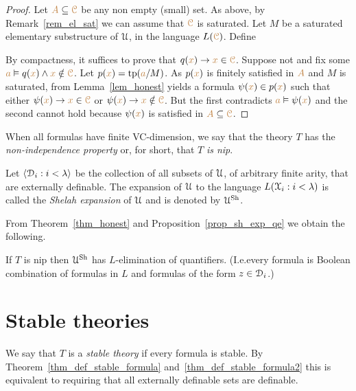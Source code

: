 \documentclass[creche.tex]{subfiles}
\begin{document}
\begin{proof}
Let ${\color{brown} A}\subseteq{\color{brown}\EuScript C}$ be any non empty (small) set. As above, by  Remark~\ref{rem_el_sat} we can assume that ${\color{brown}\EuScript C}$ is saturated. Let $M$ be a saturated elementary substructure of $\EuScript U$, in the language $L({\color{brown}\EuScript C})$. Define


By compactness, it suffices to prove that $q({\color{brown} x})\rightarrow {\color{brown}x}\in{\color{brown}\EuScript C}$. Suppose not and fix some ${\color{brown} a}\vDash q({\color{brown} x})\wedge {\color{brown}x}\notin{\color{brown}\EuScript C}$. Let $p({\color{brown} x})={\rm tp}({\color{brown} a}/M)$. As $p({\color{brown} x})$ is finitely satisfied in ${\color{brown} A}$ and $M$ is saturated, from Lemma~\ref{lem_honest} yields a formula $\psi({\color{brown} x})\in p({\color{brown} x})$ such that either $\psi({\color{brown} x})\rightarrow {\color{brown}x}\in{\color{brown}\EuScript C}$ or $\psi({\color{brown} x})\rightarrow {\color{brown}x}\notin{\color{brown}\EuScript C}$. But the first contradicts ${\color{brown} a}\vDash\psi({\color{brown} x})$ and the second cannot hold because $\psi({\color{brown} x})$ is satisfied in ${\color{brown} A}\subseteq{\color{brown}\EuScript C}$. 
\end{proof}

When all formulas have finite VC-dimension, we say that the theory $T$ has the \emph{non-independence property\/} or, for short, that $T$ \emph{is nip}.

Let $\langle\EuScript D_i:i<\lambda\rangle$ be the collection of all subsets of $\EuScript U$, of arbitrary finite arity, that are externally definable. The expansion of $\EuScript U$ to the language $L(\EuScript X_i:i<\lambda)$ is called the \emph{Shelah expansion\/} of $\EuScript U$ and is denoted by \emph{$\EuScript U^{\rm Sh}$}. 

From Theorem~\ref{thm_honest} and Proposition~\ref{prop_sh_exp_qe} we obtain the following.

\begin{corollary}\label{corol_sh_exp_qe}
If $T$ is nip then $\EuScript U^{\rm Sh}$ has $L$-elimination of quantifiers. (I.e.\@ every formula is Boolean combination of formulas in $L$ and formulas of the form $z\in\EuScript D_i$.)\QED
\end{corollary}


\section{Stable theories}
\label{stable_teories}

We say that $T$ is a \emph{stable theory\/} if every formula is stable. By Theorem~\ref{thm_def_stable_formula} and~\ref{thm_def_stable_formula2} this is equivalent to requiring that all externally definable sets are definable.
\end{document}
